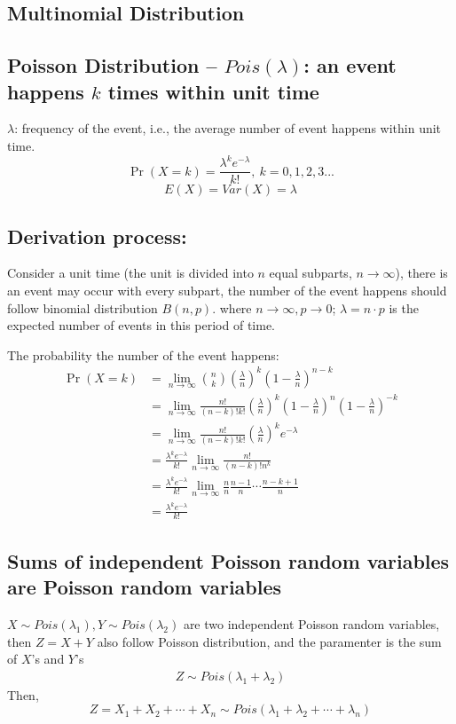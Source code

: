 \documentclass[11pt]{elegantbook}
\begin{document}
\subsection{Multinomial Distribution}

\subsection{Poisson Distribution -- $Pois(\lambda)$: an event happens $k$ times within unit time}
$\lambda$: frequency of the event, i.e., the average number of event happens within unit time.
$$\Pr(X{=}k)= \frac{\lambda^k e^{-\lambda}}{k!},\ k=0,1,2,3...$$
$$E(X)=Var(X)=\lambda$$

\subsection*{Derivation process:}
Consider a unit time (the unit is divided into $n$ equal subparts, $n \rightarrow \infty$), there is an event may occur with every subpart, the number of the event happens should follow binomial distribution $B(n,p)$. where $n \rightarrow \infty, p \rightarrow 0$; $\lambda=n\cdot p$ is the expected number of events in this period of time.

The probability the number of the event happens:
\begin{equation}
    \begin{aligned}
        \Pr(X=k)&=\lim_{n \rightarrow\infty} \binom{n}{k} (\frac{\lambda}{n})^k(1-\frac{\lambda}{n})^{n-k}\\
        &=\lim_{n \rightarrow\infty} \frac{n!}{(n-k)!k!} (\frac{\lambda}{n})^k(1-\frac{\lambda}{n})^{n}(1-\frac{\lambda}{n})^{-k}\\
        &=\lim_{n \rightarrow\infty}\frac{n!}{(n-k)!k!} (\frac{\lambda}{n})^k e^{-\lambda}\\
        &=\frac{\lambda^k e^{-\lambda}}{k!}\lim_{n \rightarrow\infty}\frac{n!}{(n-k)!n^k}\\
        &=\frac{\lambda^k e^{-\lambda}}{k!}\lim_{n \rightarrow\infty}
        \frac{n}{n}\frac{n-1}{n}\cdots \frac{n-k+1}{n}\\
        &=\frac{\lambda^k e^{-\lambda}}{k!}
    \end{aligned}
    \nonumber
\end{equation}

\subsection*{Sums of independent Poisson random variables are Poisson random variables}
$X\sim Pois(\lambda_1), Y\sim Pois(\lambda_2)$ are two independent Poisson random variables, then $Z=X+Y$ also follow Poisson distribution, and the paramenter is the sum of $X$'s and $Y$'s
\begin{equation}
    \begin{aligned}
        Z\sim Pois(\lambda_1+\lambda_2)
    \end{aligned}
    \nonumber
\end{equation}
Then, $$Z=X_1+X_2+\cdots+X_n\sim Pois(\lambda_1+\lambda_2+\cdots+\lambda_n)$$
\end{document}
